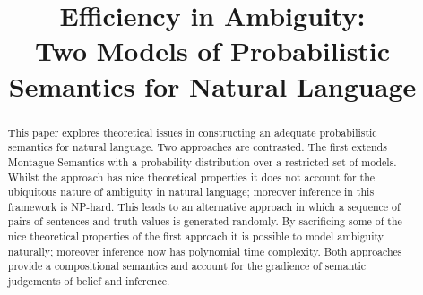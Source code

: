 \documentclass[11pt]{article}
\title{Efficiency in Ambiguity:\\ Two Models of Probabilistic Semantics for Natural Language}
\author{}
\date{}
\theoremstyle{definition}
\begin{document}
\maketitle
\begin{abstract}
This paper explores theoretical issues in constructing an adequate probabilistic semantics for natural language. Two approaches are contrasted. The first extends Montague
Semantics with a probability distribution over a restricted set of
models. Whilst the approach has nice theoretical properties it does
not account for the ubiquitous nature of ambiguity in natural
language; moreover inference in this framework is
NP-hard. This leads to an alternative approach in which a sequence of pairs of sentences and truth values is generated
randomly. By sacrificing some of the nice theoretical properties of
the first approach it is possible to model ambiguity naturally;
moreover inference now has polynomial time
complexity. Both approaches provide a compositional semantics and account for the gradience of semantic judgements of belief and inference.  
\end{abstract}



\end{document}
